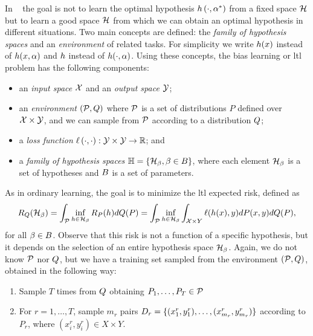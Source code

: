 In ~\cite{baxter2000model} the goal is not to learn the optimal hypothesis $h\left(\cdot, \alpha^*\right)$ from a fixed space $\mathcal{H}$ but to learn a good space $\mathcal{H}$ from which we can obtain an optimal hypothesis in different situations.
%
Two main concepts are defined: the \emph{family of hypothesis spaces} and an \emph{environment} of related tasks. 
For simplicity we write $h(x)$ instead of $h(x, \alpha)$ and $h$ instead of $h(\cdot, \alpha)$.
Using these concepts, the bias learning or \acrshort{ltl} problem has the following components:
\begin{itemize}
    \item an \emph{input space} $\mathcal{X}$ and an \emph{output space} $\mathcal{Y}$;
    \item an \emph{environment} $(\mathcal{P}, Q)$ where $\mathcal{P}$ is a set of distributions $P$ defined over $\mathcal{X} \times \mathcal{Y}$, and we can sample from $\mathcal{P}$ according to a distribution $Q$;
    \item a \emph{loss function} $\ell\left( \cdot, \cdot\right):\mathcal{Y} \times \mathcal{Y} \to \mathbb{R}$; and
    \item a \emph{family of hypothesis spaces} $\mathbb{H} = \left\{\mathcal{H}_\beta, \beta \in B\right\}$, where each element $\mathcal{H}_\beta$ is a set of hypotheses and $B$ is a set of parameters.
\end{itemize}
As in ordinary learning, the goal is to minimize the \acrshort{ltl} expected risk, defined as
\begin{equation}\label{eq:biaslearn_exprisk}
    \bexprisk(\hypspace_\fparam) = \int_{\bprobspace} \inf_{\hypf \in \hypspace_\fparam} \risk_P(\hypf) d\bdistf(P) = \int_{\bprobspace} \inf_{\hypf \in \hypspace_\fparam} \int_{\Xspace \times Y} \lossf(h(x), y) dP(x, y) d\bdistf(P) ,
\end{equation}
for all $\beta \in B$.
Observe that this risk is not a function of a specific hypothesis, but it depends on the selection of an entire hypothesis space $\mathcal{H}_\beta$.
Again, we do not know $\mathcal{P}$ nor $Q$, but we have a training set sampled from the environment $(\mathcal{P}, Q)$, obtained in the following way:
\begin{enumerate}
    \item Sample $T$ times from $Q$ obtaining $P_1, \ldots, P_T \in \mathcal{P}$
    \item For $r=1, \ldots, T$, sample $m_r$ pairs $D_r = \{(x_1^r, y_1^r), \ldots, (x_{m_r}^r, y_{m_r}^r)\}$ according to $P_r$, where $(x_i^r, y_i^r) \in X \times Y$.
\end{enumerate}
